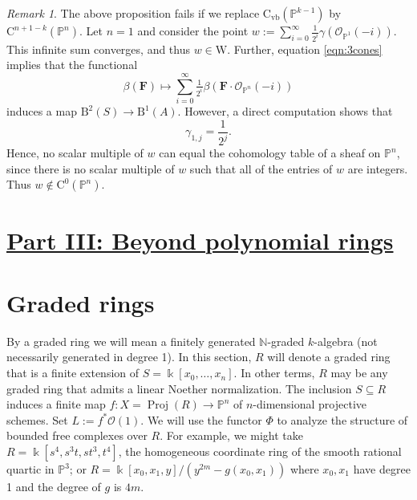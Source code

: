 \documentclass[12pt]{amsart}
\theoremstyle{definition}
\theoremstyle{remark}
\newtheorem{remark}[lemma]{Remark}
\newcommand{\Proj}{\operatorname{Proj}}
\newcommand{\kk}{\Bbbk}
\newcommand{\PP}{\mathbb{P}}
\newcommand{\WW}{\mathrm{W}}
\newcommand{\NN}{\mathbb{N}}
\newcommand{\cO}{\mathcal{O}}
\newcommand{\FF}{\mathbf{F}}
\newcommand{\defi}[1]{\textsf{#1}} %
\newcommand{\CQ}{\mathrm{C}}
\newcommand{\CvbQ}{\mathrm{C}_{\text{vb}}}
\newcommand{\BBQ}{\mathrm{B}}
\renewcommand{\P}{{\mathbb P}}
\begin{document}
\begin{remark}\label{rmk:issues}
The above proposition fails if we replace $\CvbQ(\PP^{k-1})$ by $\CQ^{n+1-k}(\PP^n)$.  
Let $n=1$ and consider the point $w:=\sum_{i=0}^\infty \frac{1}{2^i} \gamma(\cO_{\PP^1}(-i))$.  
This infinite sum converges, and thus $w\in \WW$.  Further, equation \eqref{eqn:3cones} implies that the functional
\[
\beta(\FF)\mapsto \sum_{i=0}^\infty \tfrac{1}{2^i} \beta(\FF\cdot \cO_{\PP^n}(-i))
\]
induces a map $\BBQ^{2}(S)\to \BBQ^1(A)$.  However, a direct computation shows that
\[
\gamma_{1,j}=\frac{1}{2^{j}}.
\]
Hence, no scalar multiple of $w$ can equal the cohomology table of a sheaf on $\PP^n$, since there is no scalar multiple of $w$ such that all of the entries of $w$ are integers.  Thus $w\notin \CQ^0(\PP^n)$.
\end{remark}


\section*{\underline{{Part III: Beyond polynomial rings}}}
\section{Graded rings}\label{sec:functor}
By a \defi{graded ring} we will mean a finitely generated $\NN$-graded $k$-algebra (not necessarily generated in degree 1).  In this section, $R$ will denote a graded ring that is a finite extension of $S=\kk[x_0,\dots,x_n]$.  In other terms, $R$ may be any graded ring that admits a linear Noether normalization.  The inclusion $S\subseteq R$ induces a finite map $f\colon X=\Proj(R)\to \PP^n$ of $n$-dimensional projective schemes. Set $L:=f^*\cO(1)$. We will use the functor $\Phi$ to analyze the structure of bounded free complexes over $R$.  For example, we might take
$R = \kk[s^{4}, s^{3}t, st^{3}, t^{4}]$, the homogeneous coordinate ring of the smooth rational
quartic in $\P^{3}$; or $R = \kk[x_{0}, x_{1}, y]/(y^{2m}-g(x_{0}, x_{1}))$ where $x_{0},x_{1}$ have
degree 1 and the degree of $g$ is $4m$.
\end{document}
